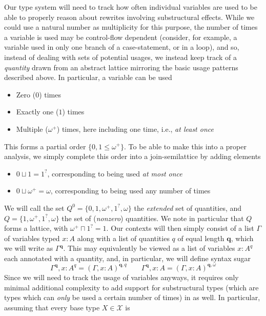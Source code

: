\documentclass[acmsmall,screen,review]{acmart}
\newcommand{\mc}[1]{\ensuremath{\mathcal{#1}}}
\newcommand{\mb}[1]{\ensuremath{\mathbf{#1}}}
\newcommand{\zeroq}{0}
\newcommand{\oneq}{1}
\newcommand{\delq}{1^?}
\newcommand{\cpyq}{\omega^+}
\newcommand{\topq}{\omega}
\begin{document}
Our type system will need to track how often individual variables are used to be able to properly
reason about rewrites involving substructural effects. While we could use a natural number as
multiplicity for this purpose, the number of times a variable is used may be control-flow dependent
(consider, for example, a variable used in only one branch of a case-statement, or in a loop), and
so, instead of dealing with sets of potential usages, we instead keep track of a \emph{quantity}
drawn from an abstract lattice mirroring the basic usage patterns described above. In particular, a
variable can be used
\begin{itemize}
  \item Zero ($\zeroq$) times
  \item Exactly one ($\oneq$) times
  \item Multiple ($\cpyq$) times, here including one time, i.e., \emph{at least once}
\end{itemize}
This forms a partial order $\{\zeroq, \oneq \leq \cpyq\}$. To be able to make this into a proper
analysis, we simply complete this order into a join-semilattice by adding elements
\begin{itemize}
  \item $\zeroq \sqcup \oneq = \delq$, corresponding to being used \emph{at most once}
  \item $\zeroq \sqcup \cpyq = \topq$, corresponding to being used any number of times
\end{itemize}
We will call the set $Q^0 = \{\zeroq, \oneq, \cpyq, \delq, \topq\}$ the \emph{extended} set of
quantities, and $Q = \{\oneq, \cpyq, \delq, \topq\}$ the set of (\emph{nonzero}) quantities. We note
in particular that $Q$ forms a lattice, with $\cpyq \sqcap \delq = 1$. Our contexts will then simply
consist of a list $\Gamma$ of variables typed $x : A$ along with a list of quantities $q$ of equal
length $\mb{q}$, which we will write as $\Gamma^{\mb{q}}$. This may equivalently be viewed as a list
of variables $x : A^q$ each annotated with a quantity, and, in particular, we will define syntax
sugar
\begin{equation}
  \Gamma^{\mb{q}}, x : A^q = (\Gamma, x : A)^{\mb{q}, q} \qquad
  \Gamma^{\mb{q}}, x : A =  (\Gamma, x : A)^{\mb{q}, \topq}
\end{equation}
Since we will need to track the usage of variables anyways, it requires only minimal additional
complexity to add support for substructural types (which are types which can \emph{only} be used a
certain number of times) in as well. In particular, assuming that every base type $X \in \mc{X}$ is
\end{document}
